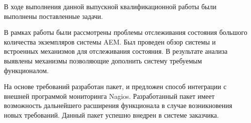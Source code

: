 \Conclusion %

В ходе выполнения данной выпускной квалификационной работы были выполнены поставленные задачи.

В рамках работы были рассмотрены проблемы отслеживания состояния большого количества экземпляров системы AEM. Был проведен обзор системы и встроенных механизмов для отслеживания состояния. В результате анализа выявлены механизмы позволяющие дополнить систему требуемым функционалом.

На основе требований разработан пакет, и предложен способ интеграции с внешней программой мониторинга Nagios. Разработанный пакет имеет возможность дальнейшего расширения функционала в случае возникновения новых требований. Данный пакет успешно внедрен в системе заказчика.

